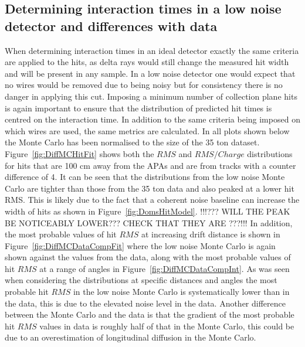 \subsection{Determining interaction times in a low noise detector and differences with data}
When determining interaction times in an ideal detector exactly the same criteria are applied to the hits, as delta rays would still change the measured hit width and will be present in any sample. In a low noise detector one would expect that no wires would be removed due to being noisy but for consistency there is no danger in applying this cut. Imposing a minimum number of collection plane hits is again important to ensure that the distribution of predicted hit times is centred on the interaction time. In addition to the same criteria being imposed on which wires are used, the same metrics are calculated. In all plots shown below the Monte Carlo has been normalised to the size of the 35 ton dataset. \\

Figure~\ref{fig:DiffMCHitFit} shows both the $RMS$ and $RMS/Charge$ distributions for hits that are 100 cm away from the APAs and are from tracks with a counter difference of 4. It can be seen that the distributions from the low noise Monte Carlo are tighter than those from the 35 ton data and also peaked at a lower hit RMS. This is likely due to the fact that a coherent noise baseline can increase the width of hits as shown in Figure~\ref{fig:DomsHitModel}. !!!??? WILL THE PEAK BE NOTICEABLY LOWER??? CHECK THAT THEY ARE ???!!! In addition, the most probable values of hit $RMS$ at increasing drift distance is shown in Figure~\ref{fig:DiffMCDataCompFit} where the low noise Monte Carlo is again shown against the values from the data, along with the most probable values of hit $RMS$ at a range of angles in Figure~\ref{fig:DiffMCDataCompInt}. As was seen when considering the distributions at specific distances and angles the most probable hit $RMS$ in the low noise Monte Carlo is systematically lower than in the data, this is due to the elevated noise level in the data. Another difference between the Monte Carlo and the data is that the gradient of the most probable hit $RMS$ values in data is roughly half of that in the Monte Carlo, this could be due to an overestimation of longitudinal diffusion in the Monte Carlo. \\

